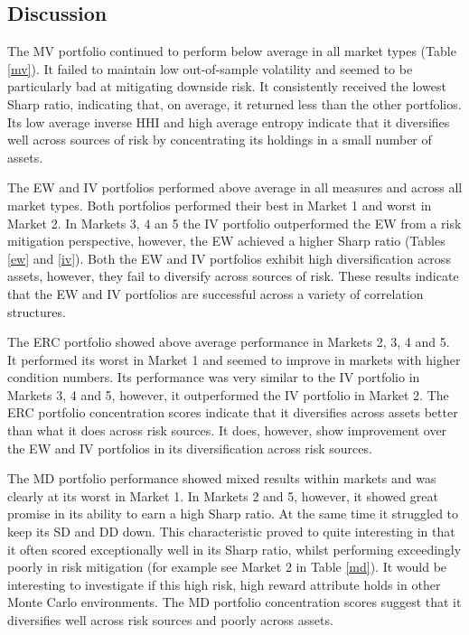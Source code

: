 \documentclass[11pt,preprint, authoryear]{elsarticle}
\numberwithin{equation}{section}
\numberwithin{figure}{section}
\numberwithin{table}{section}
\begin{document}
\hypertarget{discussion}{%
\subsection{Discussion}\label{discussion}}

The MV portfolio continued to perform below average in all market types
(Table \ref{mv}). It failed to maintain low out-of-sample volatility and
seemed to be particularly bad at mitigating downside risk. It
consistently received the lowest Sharp ratio, indicating that, on
average, it returned less than the other portfolios. Its low average
inverse HHI and high average entropy indicate that it diversifies well
across sources of risk by concentrating its holdings in a small number
of assets.

The EW and IV portfolios performed above average in all measures and
across all market types. Both portfolios performed their best in Market
1 and worst in Market 2. In Markets 3, 4 an 5 the IV portfolio
outperformed the EW from a risk mitigation perspective, however, the EW
achieved a higher Sharp ratio (Tables \ref{ew} and \ref{iv}). Both the
EW and IV portfolios exhibit high diversification across assets,
however, they fail to diversify across sources of risk. These results
indicate that the EW and IV portfolios are successful across a variety
of correlation structures.

The ERC portfolio showed above average performance in Markets 2, 3, 4
and 5. It performed its worst in Market 1 and seemed to improve in
markets with higher condition numbers. Its performance was very similar
to the IV portfolio in Markets 3, 4 and 5, however, it outperformed the
IV portfolio in Market 2. The ERC portfolio concentration scores
indicate that it diversifies across assets better than what it does
across risk sources. It does, however, show improvement over the EW and
IV portfolios in its diversification across risk sources.

The MD portfolio performance showed mixed results within markets and was
clearly at its worst in Market 1. In Markets 2 and 5, however, it showed
great promise in its ability to earn a high Sharp ratio. At the same
time it struggled to keep its SD and DD down. This characteristic proved
to quite interesting in that it often scored exceptionally well in its
Sharp ratio, whilst performing exceedingly poorly in risk mitigation
(for example see Market 2 in Table \ref{md}). It would be interesting to
investigate if this high risk, high reward attribute holds in other
Monte Carlo environments. The MD portfolio concentration scores suggest
that it diversifies well across risk sources and poorly across assets.
\end{document}
